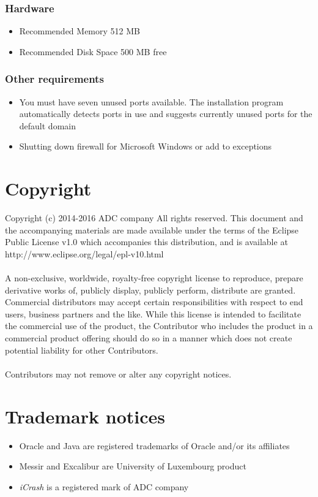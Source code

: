 \subsubsection{Hardware}
\begin{itemize}
  \item Recommended Memory 512 MB
  \item Recommended Disk Space 500 MB free
\end{itemize}

\subsubsection{Other requirements}
\begin{itemize}
  \item You must have seven unused ports available. The installation program
  automatically detects ports in use and suggests currently unused ports for the default domain
  \item Shutting down firewall for Microsoft Windows or add to exceptions
\end{itemize}



\section{Copyright}
Copyright (c) 2014-2016 ADC company
All rights reserved. This document and the accompanying materials are made
available under the terms of the Eclipse Public License v1.0 which accompanies
this distribution, and is available at http://www.eclipse.org/legal/epl-v10.html
\\
\\
A non-exclusive, worldwide, royalty-free copyright license to reproduce, prepare
derivative works of, publicly display, publicly perform, distribute are granted.
Commercial distributors may accept certain responsibilities with respect to end
users, business partners and the like. While this license is intended to
facilitate the commercial use of the product, the Contributor who includes the
product in a commercial product offering should do so in a manner which does not
create potential liability for other Contributors.
\\
\\
Contributors may not remove or alter any copyright notices.


\section{Trademark notices}
\begin{itemize}
  \item Oracle and Java are registered trademarks of Oracle and/or its
  affiliates
  \item Messir and Excalibur are University of Luxembourg product
  \item \emph{iCrash} is a registered mark of ADC company
\end{itemize}

